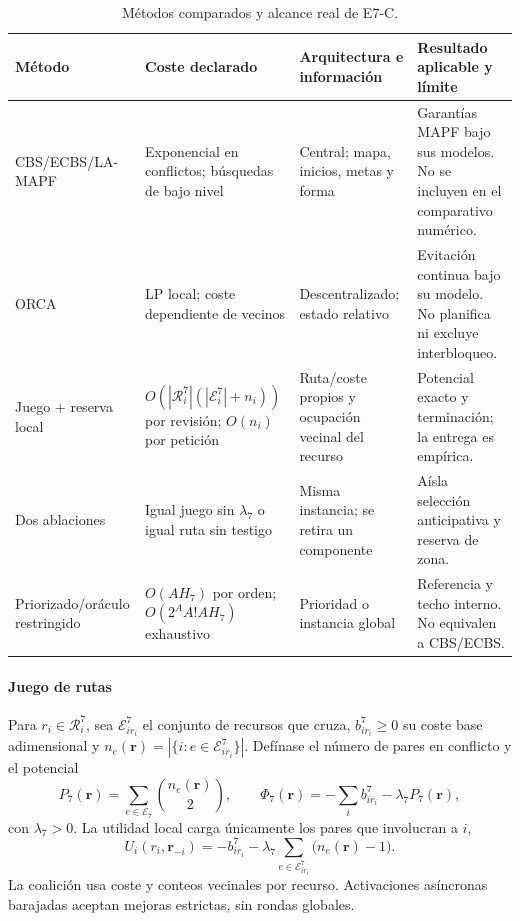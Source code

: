 \begin{table}[!htbp]
  \centering
  \caption{Métodos comparados y alcance real de E7-C.}
  \label{tab:sp7-methods}
  \scriptsize
  \setlength{\tabcolsep}{2.1pt}
  \begin{tabularx}{\textwidth}{p{2.25cm}p{2.25cm}p{2.55cm}Y}
    \toprule
    Método & Coste declarado & Arquitectura e información & Resultado aplicable y límite \\
    \midrule
    CBS/ECBS/LA-MAPF & Exponencial en conflictos; búsquedas de bajo nivel & Central; mapa, inicios, metas y forma & Garantías MAPF bajo sus modelos. No se incluyen en el comparativo numérico. \\
    ORCA & LP local; coste dependiente de vecinos & Descentralizado; estado relativo & Evitación continua bajo su modelo. No planifica ni excluye interbloqueo. \\
    Juego + reserva local & $O(|\mathcal R_i^7|(|\mathcal E_i^7|+n_i))$ por revisión; $O(n_i)$ por petición & Ruta/coste propios y ocupación vecinal del recurso & Potencial exacto y terminación; la entrega es empírica. \\
    Dos ablaciones & Igual juego sin $\lambda_7$ o igual ruta sin testigo & Misma instancia; se retira un componente & Aísla selección anticipativa y reserva de zona. \\
    Priorizado/oráculo restringido & $O(AH_7)$ por orden; $O(2^AA!AH_7)$ exhaustivo & Prioridad o instancia global & Referencia y techo interno. No equivalen a CBS/ECBS. \\
    \bottomrule
  \end{tabularx}
\end{table}

\paragraph{Juego de rutas}

Para $r_i\in\mathcal R_i^7$, sea $\mathcal E_{ir_i}^7$ el conjunto de recursos que cruza, $b_{ir_i}^7\geq0$ su coste base adimensional y
$n_e(\boldsymbol r)=|\{i:e\in\mathcal E_{ir_i}^7\}|$. Defínase el número de pares en conflicto y el potencial
\begin{equation}
\label{eq:sp7-potential}
 P_7(\boldsymbol r)=\sum_{e\in\mathcal E_7}\binom{n_e(\boldsymbol r)}{2},
 \qquad
 \Phi_7(\boldsymbol r)=-\sum_i b_{ir_i}^7-\lambda_7P_7(\boldsymbol r),
\end{equation}
con $\lambda_7>0$. La utilidad local carga únicamente los pares que involucran a $i$,
\begin{equation}
\label{eq:sp7-payoff}
 U_i(r_i,\boldsymbol r_{-i})=-b_{ir_i}^7
 -\lambda_7\sum_{e\in\mathcal E_{ir_i}^7}\bigl(n_e(\boldsymbol r)-1\bigr).
\end{equation}
La coalición usa coste y conteos vecinales por recurso. Activaciones asíncronas barajadas aceptan mejoras estrictas, sin rondas globales.

